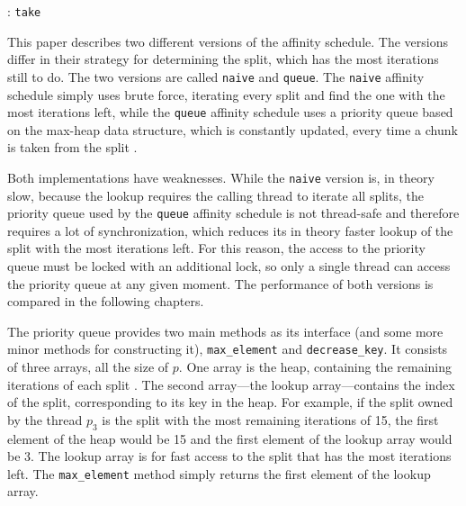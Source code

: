 \documentclass[twoside,11pt]{article}
\begin{document}
\begin{algorithm}
  \caption{: \texttt{take}}
  \label{alg:take}

  \begin{algorithmic}[1]
    \ELSE
    \ENDIF
  \end{algorithmic}
\end{algorithm}

This paper describes two different versions of the affinity
schedule.
The versions differ in their strategy for determining the
split, which has the most iterations still to do.
The two versions are called \texttt{naive} and
\texttt{queue}.
The \texttt{naive} affinity schedule simply uses brute
force, iterating every split and find the one with the most
iterations left, while the \texttt{queue} affinity schedule
uses a priority queue based on the max-heap data structure,
which is constantly updated, every time a chunk is taken
from the split \citep[for the max-heap data structure see
e.g.][Chapter 6]{cormen}.

Both implementations have weaknesses.
While the \texttt{naive} version is, in theory slow,
because the lookup requires the calling thread to iterate
all splits, the priority queue used by the \texttt{queue}
affinity schedule is not thread-safe and therefore requires
a lot of synchronization, which reduces its in theory
faster lookup of the split with the most iterations left.
For this reason, the access to the priority queue must be
locked with an additional lock, so only
a single thread can access the priority queue at any given
moment.
The performance of both versions is compared in the
following chapters.

The priority queue provides two main methods as its
interface (and some more minor methods for constructing
it), \texttt{max\_element} and \texttt{decrease\_key}.
It consists of three arrays, all the size of $p$.
One array is the heap, containing the remaining iterations
of each split \citep[see][Chapter 6]{cormen}.
The second array---the lookup array---contains the index of
the split, corresponding to its key in the heap.
For example, if the split owned by the thread $p_3$ is the
split with the most remaining iterations of 15, the first
element of the heap would be 15 and the first element of
the lookup array would be 3.
The lookup array is for fast access to the split that has
the most iterations left.
The \texttt{max\_element} method simply returns the first
element of the lookup array.
\end{document}
